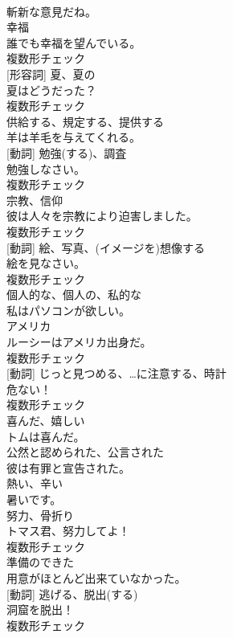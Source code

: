 \documentclass[8pt]{extreport}
\begin{document}
\begin{CJK}{UTF8}{min}
\\	斬新な意見だね。	
\\	[名詞]	幸福	
\\	誰でも幸福を望んでいる。	
\\	複数形チェック
\\	[名詞] [形容詞]	夏、夏の	
\\	夏はどうだった？	
\\	複数形チェック
\\	[動詞]	供給する、規定する、提供する	
\\	羊は羊毛を与えてくれる。	
\\	[名詞] [動詞]	勉強(する)、調査	
\\	勉強しなさい。	
\\	複数形チェック
\\	[名詞]	宗教、信仰	
\\	彼は人々を宗教により迫害しました。	
\\	複数形チェック
\\	[名詞] [動詞]	絵、写真、(イメージを)想像する	
\\	絵を見なさい。	
\\	複数形チェック
\\	[形容詞]	個人的な、個人の、私的な	
\\	私はパソコンが欲しい。	
\\	[名詞]	アメリカ	
\\	ルーシーはアメリカ出身だ。	
\\	複数形チェック
\\	[名詞] [動詞]	じっと見つめる、…に注意する、時計	
\\	危ない！	
\\	複数形チェック
\\	[形容詞]	喜んだ、嬉しい	
\\	トムは喜んだ。	
\\	[形容詞]	公然と認められた、公言された	
\\	彼は有罪と宣告された。	
\\	[形容詞]	熱い、辛い	
\\	暑いです。	
\\	[名詞]	努力、骨折り	
\\	トマス君、努力してよ！	
\\	複数形チェック
\\	[形容詞]	準備のできた	
\\	用意がほとんど出来ていなかった。	
\\	[名詞] [動詞]	逃げる、脱出(する)	
\\	洞窟を脱出！	
\\	複数形チェック

\end{CJK}
\end{document}
